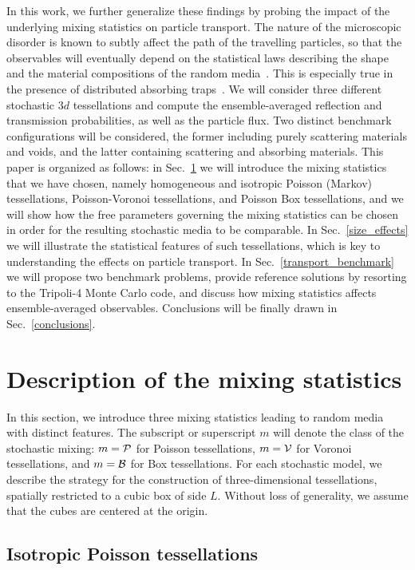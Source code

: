\documentclass[final,authoryear,5p,times,twocolumn]{elsarticle}
\newcommand{\tripoli}{{\sc Tripoli-4}\textsuperscript{ \textregistered}}
\begin{document}
In this work, we further generalize these findings by probing the impact of the underlying mixing statistics on particle transport. The nature of the microscopic disorder is known to subtly affect the path of the travelling particles, so that the observables will eventually depend on the statistical laws describing the shape and the material compositions of the random media~\cite{torquato, bouchaud, davis, renewal}. This is especially true in the presence of distributed absorbing traps~\cite{bouchaud}. We will consider three different stochastic $3d$ tessellations and compute the ensemble-averaged reflection and transmission probabilities, as well as the particle flux. Two distinct benchmark configurations will be considered, the former including purely scattering materials and voids, and the latter containing scattering and absorbing materials. This paper is organized as follows: in Sec.~\ref{section_models} we will introduce the mixing statistics that we have chosen, namely homogeneous and isotropic Poisson (Markov) tessellations, Poisson-Voronoi tessellations, and Poisson Box tessellations, and we will show how the free parameters governing the mixing statistics can be chosen in order for the resulting stochastic media to be comparable. In Sec.~\ref{size_effects} we will illustrate the statistical features of such tessellations, which is key to understanding the effects on particle transport. In Sec.~\ref{transport_benchmark} we will propose two benchmark problems, provide reference solutions by resorting to the \tripoli{} Monte Carlo code, and discuss how mixing statistics affects ensemble-averaged observables. Conclusions will be finally drawn in Sec.~\ref{conclusions}.

\section{Description of the mixing statistics}
\label{section_models}

In this section, we introduce three mixing statistics leading to random media with distinct features. The subscript or superscript $m$ will denote the class of the stochastic mixing: $m={\cal P}$ for Poisson tessellations, $m={\cal V}$ for Voronoi tessellations, and $m={\cal B}$ for Box tessellations. For each stochastic model, we describe the strategy for the construction of three-dimensional tessellations, spatially restricted to a cubic box of side $L$. Without loss of generality, we assume that the cubes are centered at the origin.

\subsection{Isotropic Poisson tessellations}
\label{poisson}
\end{document}
